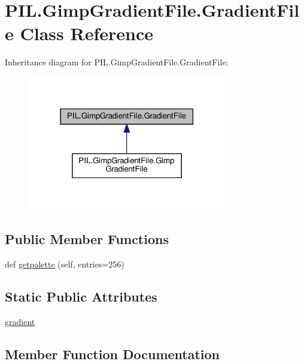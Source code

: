 \hypertarget{classPIL_1_1GimpGradientFile_1_1GradientFile}{}\section{P\+I\+L.\+Gimp\+Gradient\+File.\+Gradient\+File Class Reference}
\label{classPIL_1_1GimpGradientFile_1_1GradientFile}


Inheritance diagram for P\+I\+L.\+Gimp\+Gradient\+File.\+Gradient\+File\+:
\nopagebreak
\begin{figure}[H]
\begin{center}
\leavevmode
\includegraphics[width=246pt]{classPIL_1_1GimpGradientFile_1_1GradientFile__inherit__graph}
\end{center}
\end{figure}
\subsection*{Public Member Functions}
\begin{DoxyCompactItemize}
\item 
def \hyperlink{classPIL_1_1GimpGradientFile_1_1GradientFile_a5ebe0b111a0a7db8ea8f4816dee3d975}{getpalette} (self, entries=256)
\end{DoxyCompactItemize}
\subsection*{Static Public Attributes}
\begin{DoxyCompactItemize}
\item 
\hyperlink{classPIL_1_1GimpGradientFile_1_1GradientFile_ad10c6a6d81a625f5fe9b04f555654135}{gradient}
\end{DoxyCompactItemize}


\subsection{Member Function Documentation}
\mbox{\label{classPIL_1_1GimpGradientFile_1_1GradientFile_a5ebe0b111a0a7db8ea8f4816dee3d975}} 
